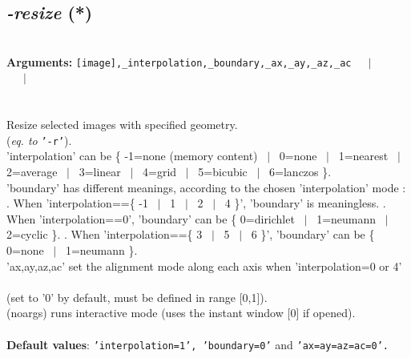 \documentclass[a4paper,11pt,twoside]{book}
\begin{document}
\subsection{\emph{-resize} (*)}\vspace*{-0.5em}
~\\\textbf{Arguments: } 
{\small \texttt{[image],\_interpolation,\_boundary,\_ax,\_ay,\_az,\_ac}}~~~$|$\\
~~~$|$\\
\\~\\
Resize selected images with specified geometry.
~\\(\emph{eq. to} {\small \texttt{'-r'}}).
~\\'interpolation' can be \{ -1=none (memory content) ~$|$~ 0=none ~$|$~ 1=nearest ~$|$~ 2=average ~$|$~ 3=linear ~$|$~ 4=grid ~$|$~ 5=bicubic ~$|$~ 6=lanczos \}.
~\\'boundary' has different meanings, according to the chosen 'interpolation' mode :
. When 'interpolation==\{ -1 ~$|$~ 1 ~$|$~ 2 ~$|$~ 4 \}', 'boundary' is meaningless.
. When 'interpolation==0', 'boundary' can be \{ 0=dirichlet ~$|$~ 1=neumann ~$|$~ 2=cyclic \}.
. When 'interpolation==\{ 3 ~$|$~ 5 ~$|$~ 6 \}', 'boundary' can be \{ 0=none ~$|$~ 1=neumann \}.
~\\'ax,ay,az,ac' set the alignment mode along each axis when 'interpolation=0 or 4'
~\\(set to '0' by default, must be defined in range [0,1]).
~\\(noargs) runs interactive mode (uses the instant window [0] if opened).
~\\~\\\textbf{Default values}: {\small \texttt{'interpolation=1', 'boundary=0'} and \texttt{'ax=ay=az=ac=0'.}}
\end{document}
